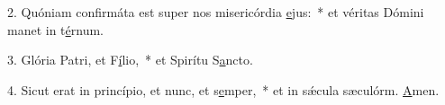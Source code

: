 2. Quóniam confirmáta est super nos misericórdia \uline{e}jus:~* et véritas Dómini manet in t\uline{é}rnum.\par 
3. Glória Patri, et F\uline{í}lio,~* et Spirítu S\uline{a}ncto.\par 
4. Sicut erat in princípio, et nunc, et s\uline{e}mper,~* et in sǽcula sæculórm. \uline{A}men.\par 
